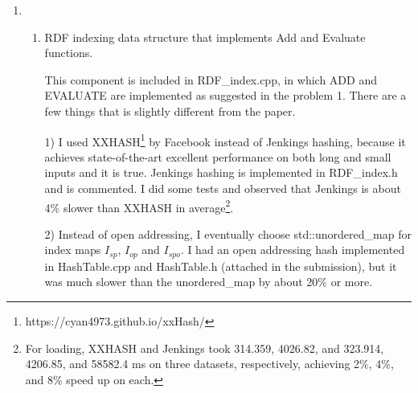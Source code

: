 \documentclass{article}
\begin{document}
\begin{enumerate}
\begin{enumerate}
\begin{algorithm}[H]
\caption{Evaluate $\langle X, Y, o\rangle$}\label{alg:evaluateXYO}
\begin{algorithmic}
\Require $t = \langle X, Y, o\rangle$, where $X$ and $Y$ are special codes stand for variables. 
\Do
{}
\State $t'\leftarrow$ the triple $I_{o}$ points to, \textit{index} $\leftarrow$ $t'.N_{op}$.
\Else 
\State $t'\leftarrow t.N_{op}$, \textit{index} $\leftarrow t'.N_{op}$
\EndIf
{}
\State \textit{index} = \textit{EndSearch}
\EndIf
\end{algorithmic}
\end{algorithm}
The idea for the other two patterns is similar; starts from $I_p$ or $I_s$ map and traverse the $p$-list or $sp$-list.

When there are three free variables, the paper suggests to match, for example, the patterns like $\langle X, Y, Z\rangle$, we need to iterate over the triple table; if we want $X = Y$,  we skip those $X\neq Y$. However, this is not efficient. Therefore, I modified a little bit and the idea and pseudo-code are discussed in 2.a, where I put everything that is different from paper there. 

\end{enumerate}
\item 
\begin{enumerate}
\item RDF indexing data structure that implements Add and Evaluate functions.

This component is included in RDF\_index.cpp, in which ADD and EVALUATE are implemented as suggested in the problem 1. There are a few things that is slightly different from the paper. 

1) I used XXHASH\footnote{https://cyan4973.github.io/xxHash/} by Facebook instead of Jenkings hashing, because it achieves state-of-the-art excellent performance on both long and small inputs and it is true. Jenkings hashing is implemented in RDF\_index.h and is commented. I did some tests and observed that Jenkings is about 4\% slower than XXHASH in average\footnote{For loading, XXHASH and Jenkings took 314.359, 4026.82, and 323.914, 4206.85, and 58582.4 ms on three datasets, respectively, achieving 2\%, 4\%, and 8\% speed up on each.}. 

2) Instead of open addressing, I eventually choose std::unordered\_map for index maps $I_{sp}$, $I_{op}$ and $I_{spo}$. I had an open addressing hash implemented in HashTable.cpp and HashTable.h (attached in the submission), but it was much slower than the unordered\_map by about 20\% or more.


\end{enumerate}
\end{enumerate}
\end{document}
